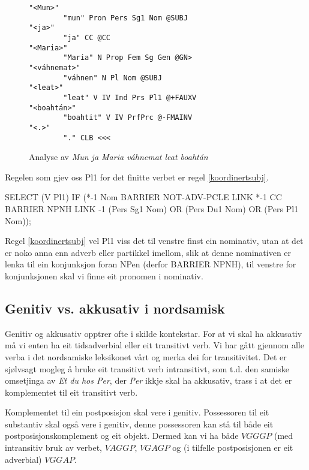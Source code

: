 \documentclass[a4paper,norsk]{article}
\begin{document}
\begin{figure}[htbp]
\begin{center}
\begin{verbatim}
"<Mun>"
        "mun" Pron Pers Sg1 Nom @SUBJ
"<ja>"
        "ja" CC @CC
"<Maria>"
        "Maria" N Prop Fem Sg Gen @GN>
"<váhnemat>"
        "váhnen" N Pl Nom @SUBJ
"<leat>"
        "leat" V IV Ind Prs Pl1 @+FAUXV
"<boahtán>"
        "boahtit" V IV PrfPrc @-FMAINV
"<.>"
        "." CLB <<<
\end{verbatim}
\caption{Analyse av \textit{Mun ja Maria váhnemat leat boahtán}}
\label{mjam}
\end{center}
\end{figure}

 
Regelen som gjev oss Pl1 for det finitte verbet er regel  \ref{koordinertsubj}. %
 
\begin{example}\label{koordinertsubj}
SELECT (V Pl1) IF (*-1 Nom BARRIER NOT-ADV-PCLE LINK *-1 CC BARRIER NPNH
	LINK -1 (Pers Sg1 Nom) OR (Pers Du1 Nom) OR (Pers Pl1 Nom));
\end{example}%

Regel \ref{koordinertsubj} vel Pl1 viss det til venstre finst ein nominativ, utan at det er noko anna enn adverb eller partikkel imellom, slik at denne nominativen er lenka til ein konjunksjon foran NPen (derfor BARRIER NPNH), til venstre for konjunksjonen skal vi finne eit pronomen i nominativ. %





\subsection{Genitiv vs. akkusativ i nordsamisk}

Genitiv og akkusativ opptrer ofte i skilde kontekstar. For at vi skal ha akkusativ må vi enten ha eit tidsadverbial eller eit transitivt verb. Vi har gått gjennom alle verba i det nordsamiske leksikonet vårt og merka dei for transitivitet. Det er sjølvsagt mogleg å bruke eit transitivt  verb intransitivt, som t.d. den samiske omsetjinga av \textit{Et du hos Per}, der \textit{Per} ikkje skal ha akkusativ, trass i at det er komplementet til eit transitivt verb. %

Komplementet til ein postposisjon skal vere i genitiv. Possessoren til eit substantiv skal også vere i genitiv, denne possessoren kan stå til både eit postposisjonskomplement og eit objekt. Dermed kan vi ha både $VGGGP$ (med intransitiv bruk av verbet, $VAGGP$, $VGAGP$ og (i tilfelle postposisjonen er eit adverbial) $VGGAP$. %
\end{document}
